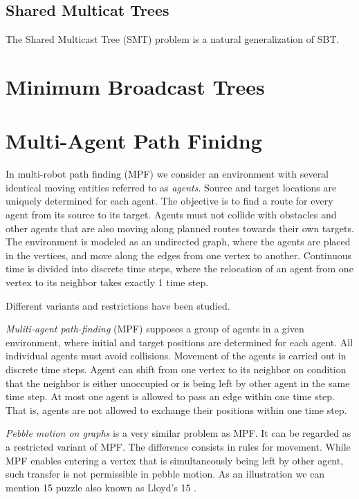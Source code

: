 \subsection{Shared Multicat Trees}

The Shared Multicast Tree (SMT) problem is a natural generalization of SBT.


\section{Minimum Broadcast Trees}\label{sec:mbt}

\section{Multi-Agent Path Finidng}\label{sec:app}

In multi-robot path finding (MPF) we consider an environment with several identical moving entities referred to as 
\emph{agents}. Source and target locations are uniquely determined for each agent. The objective
is to find a route for every agent from its source to its target.
Agents must not collide with obstacles and other agents that are also moving along
planned routes towards their own targets.
The environment is modeled as an undirected graph, where the agents are placed in the vertices, and move along the edges from one vertex to another. 
Continuous time is divided into discrete time steps, where the relocation of an agent from one vertex to its neighbor takes exactly 1 time step.

Different variants and restrictions have been studied.

\emph{Muliti-agent path-finding} (MPF) \cite{source1}  supposes a group of agents in a given
environment, where initial and target positions are determined for each agent.
All individual agents must avoid collisions. Movement of the agents is carried
out in discrete time steps. Agent can shift from one vertex to its neighbor on
condition that the neighbor is either unoccupied or is being left by other agent
in the same time step. At most one agent is allowed to pass an edge within one
time step. That is, agents are not allowed to exchange their positions within one
time step.

\emph{Pebble motion on graphs} \cite{source1,source2} is a very similar problem as MPF. It can
be regarded as a restricted variant of MPF. The difference consists in rules for
movement. While MPF enables entering a vertex that is simultaneously being
left by other agent, such transfer is not permissible in pebble motion. As an
illustration we can mention 15 puzzle also known as Lloyd’s 15 \cite{lloydXX}.

